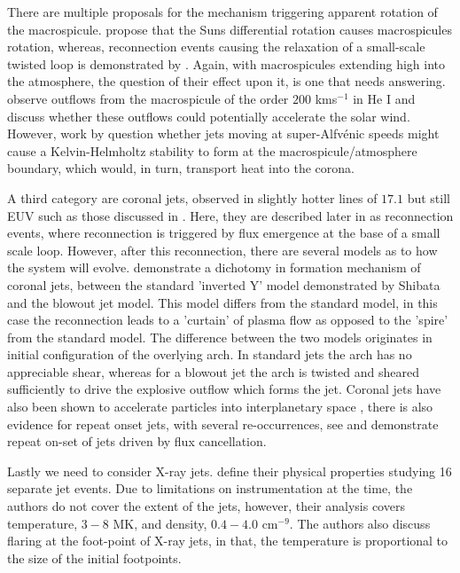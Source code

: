 \documentclass{emulateapj}
\begin{document}
There are multiple proposals for the mechanism triggering apparent rotation of the macrospicule. 
\cite{Curdt2011} propose that the Suns differential rotation causes macrospicules rotation, whereas, reconnection events causing the relaxation of a small-scale twisted loop is demonstrated by \cite{Adams2014}.
Again, with macrospicules extending high into the atmosphere, the question of their effect upon it, is one that needs answering.
\cite{Pike_Harrison1997} observe outflows from the macrospicule of the order $200$ kms$^{-1}$ in He I and discuss whether these outflows could potentially accelerate the solar wind.
However, work by \cite{Zaqarashvili2014} question whether jets moving at super-Alfv{\'e}nic speeds might cause a Kelvin-Helmholtz stability to form at the macrospicule/atmosphere boundary, which would, in turn, transport heat into the corona.

A third  category are coronal jets, observed in slightly hotter lines of $17.1$ but still EUV such as those discussed in \cite{Shibata1992}.
Here, they are described later in \cite{Shibata1994} as reconnection events, where reconnection is triggered by flux emergence at the base of a small scale loop.
However, after this reconnection, there are several models as to how the system will evolve.
\cite{Moore2010} demonstrate a dichotomy in formation mechanism of coronal jets, between the standard 'inverted Y' model demonstrated by Shibata and the blowout jet model. 
This model differs from the standard model, in this case the reconnection leads to a 'curtain' of plasma flow as opposed to the 'spire' from the standard model.
The difference between the two models originates in initial configuration of the overlying arch. 
In standard jets the arch has no appreciable shear, whereas for a blowout jet the arch is twisted and sheared sufficiently to drive the explosive outflow which forms the jet.
Coronal jets have also been shown to accelerate particles into interplanetary space \citep{Li2011}, there is also evidence for repeat onset jets, with several re-occurrences, see \cite{Li2011} and \cite{Chifor2008} demonstrate repeat on-set of jets driven by flux cancellation.

Lastly we need to consider X-ray jets.
\cite{Shimojo2000} define their physical properties studying 16 separate jet events.
Due to limitations on instrumentation at the time, the authors do not cover the extent of the jets, however, their analysis covers temperature, $3 - 8$ MK, and density, $0.4 - 4.0$ cm$^{-9}$.
The authors also discuss flaring at the foot-point of X-ray jets, in that, the temperature is proportional to the size of the initial footpoints.
\end{document}
